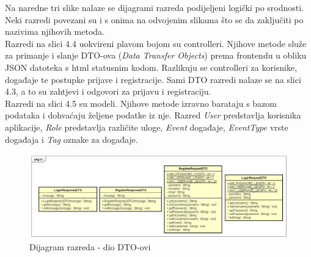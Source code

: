 			\indent Na naredne tri slike nalaze se dijagrami razreda podijeljeni logički po srodnosti. Neki razredi povezani su i s onima na odvojenim slikama što se da zaključiti po nazivima njihovih metoda. \\
			
			\indent Razredi na slici 4.4 uokvireni plavom bojom su controlleri. Njihove metode služe za primanje i slanje DTO-ova (\textit{Data Transfer Objects})  prema frontendu u obliku JSON datoteka s html statusnim kodom. Razlikuju se controlleri za korisnike, događaje te postupke prijave i registracije. Sami DTO razredi nalaze se na slici 4.3, a to su zahtjevi i odgovori za prijavu i registraciju.\\
			
			\indent Razredi na slici 4.5 su modeli. Njihove metode izravno barataju s bazom podataka i dohvaćaju željene podatke iz nje. Razred \textit{User} predstavlja korisnika aplikacije, \textit{Role} predstavlja različite uloge, \textit{Event} događaje, \textit{EventType} vrste događaja i \textit{Tag} oznake za događaje.
			
			
			\begin{figure}[h]
				\includegraphics[width=\textwidth]{dijagrami/UML dtoovi.png}
				\caption{Dijagram razreda - dio DTO-ovi}
			\end{figure}
		
